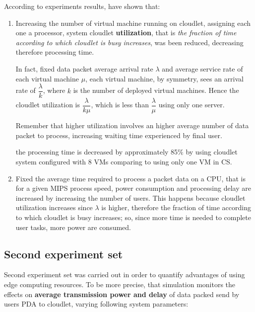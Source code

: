 \documentclass[sigchi]{acmart}
\begin{document}
According to experiments results, \cite{MSAReport} have shown that:

\begin{enumerate}

\item Increasing the number of virtual machine running on cloudlet, assigning each one a processor, system cloudlet \textbf{utilization}, that is \textit{the fraction of time according to which cloudlet is busy increases}, was been reduced, decreasing therefore processing time.

In fact, fixed data packet average arrival rate $\lambda$ and average service rate of each virtual machine $\mu$, each virtual machine, by symmetry, sees an arrival rate of $\dfrac{\lambda}{k}$, where $k$ is the number of deployed virtual machines. Hence the cloudlet utilization is $\dfrac{\lambda}{k\mu}$, which is less than $\dfrac{\lambda}{\mu}$ using only one server.  

Remember that higher utilization involves an higher average number of data packet to process, increasing waiting time experienced by final user.

\vspace{0.3cm}

\begin{quoting}[font=itshape, begintext={``}, endtext={''\cite[par.~3.3]{MSAReport}}]
the processing time is decreased by approximately 85\% by using cloudlet system configured with 8 VMs comparing to using only one VM in CS.
\end{quoting}

\vspace{0.3cm}

\item Fixed the average time required to process a packet data on a CPU, that is for a given MIPS process speed, power consumption and processing delay are increased by increasing the number of users. This happens because cloudlet utilization increases since $\lambda$ is higher, therefore the fraction of time according to which cloudlet is busy increases; so, since more time is needed to complete user tasks, more power are consumed.

\end{enumerate}

\subsection{Second experiment set}

Second experiment set was carried out in order to quantify advantages of using edge computing resources. To be more precise, that simulation monitors the effects on \textbf{average transmission power and delay} of data packed send by users PDA to cloudlet, varying following system parameters:
\end{document}
